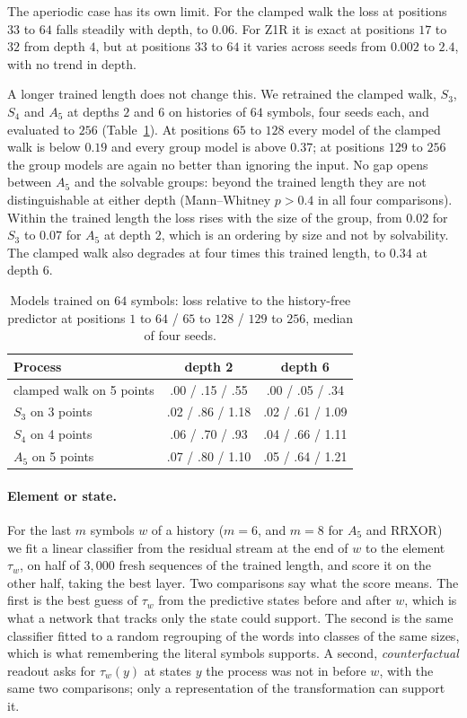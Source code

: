 \documentclass[10pt]{article}
\theoremstyle{definition}
\theoremstyle{remark}
\begin{document}
The aperiodic case has its own limit.  For the clamped walk the loss
at positions $33$ to $64$ falls steadily with depth, to $0.06$.  For
Z1R it is exact at positions $17$ to $32$ from depth $4$, but at
positions $33$ to $64$ it varies across seeds from $0.002$ to $2.4$,
with no trend in depth.

A longer trained length does not change this.  We retrained the
clamped walk, $S_3$, $S_4$ and $A_5$ at depths $2$ and $6$ on
histories of $64$ symbols, four seeds each, and evaluated to $256$
(Table~\ref{tab:a2-long}).  At positions $65$ to $128$ every model of
the clamped walk is below $0.19$ and every group model is above
$0.37$; at positions $129$ to $256$ the group models are again no
better than ignoring the input.  No gap opens between $A_5$ and the
solvable groups: beyond the trained length they are not
distinguishable at either depth (Mann--Whitney $p>0.4$ in all four
comparisons).  Within the trained length the loss rises with the
size of the group, from $0.02$ for $S_3$ to $0.07$ for $A_5$ at depth
$2$, which is an ordering by size and not by solvability.  The
clamped walk also degrades at four times this trained length, to
$0.34$ at depth $6$.

\begin{table}[ht]
\centering
\small
\begin{tabular}{lcc}
\hline
Process & depth 2 & depth 6\\
\hline
clamped walk on 5 points & .00 / .15 / .55 & .00 / .05 / .34\\
$S_3$ on 3 points & .02 / .86 / 1.18 & .02 / .61 / 1.09\\
$S_4$ on 4 points & .06 / .70 / .93 & .04 / .66 / 1.11\\
$A_5$ on 5 points & .07 / .80 / 1.10 & .05 / .64 / 1.21\\
\hline
\end{tabular}
\caption{Models trained on $64$ symbols: loss relative to the
history-free predictor at positions $1$ to $64$ / $65$ to $128$ /
$129$ to $256$, median of four seeds.}
\label{tab:a2-long}
\end{table}

\paragraph{Element or state.}
For the last $m$ symbols $w$ of a history ($m=6$, and $m=8$ for $A_5$
and RRXOR) we fit a linear classifier from the residual stream at the
end of $w$ to the element $\tau_w$, on half of $3{,}000$ fresh
sequences of the trained length, and score it on the other half,
taking the best layer.  Two comparisons say what the score means.
The first is the best guess of $\tau_w$ from the predictive states
before and after $w$, which is what a network that tracks only the
state could support.  The second is the same classifier fitted to a
random regrouping of the words into classes of the same sizes, which
is what remembering the literal symbols supports.  A second,
\emph{counterfactual} readout asks for $\tau_w(y)$ at states $y$ the
process was not in before $w$, with the same two comparisons; only a
representation of the transformation can support it.
\end{document}
